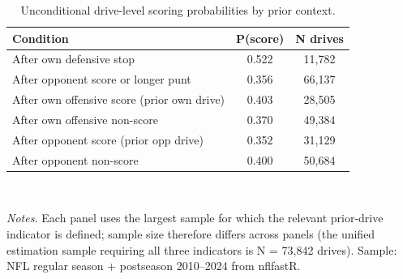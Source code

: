 \begin{table}[htbp]
\centering
\caption{Unconditional drive-level scoring probabilities by prior context.}
\label{tab:descrip}
\begin{tabular}{lcc}
\toprule
Condition & P(score) & N drives \\
\midrule
After own defensive stop & 0.522 & 11,782 \\
After opponent score or longer punt & 0.356 & 66,137 \\
\midrule
After own offensive score (prior own drive) & 0.403 & 28,505 \\
After own offensive non-score & 0.370 & 49,384 \\
\midrule
After opponent score (prior opp drive) & 0.352 & 31,129 \\
After opponent non-score & 0.400 & 50,684 \\
\bottomrule
\end{tabular}
\\[0.5em]
\begin{minipage}{0.95\textwidth}
\footnotesize
\textit{Notes.} Each panel uses the largest sample for which the relevant prior-drive indicator is defined; sample size therefore differs across panels (the unified estimation sample requiring all three indicators is N = 73{,}842 drives). Sample: NFL regular season + postseason 2010--2024 from nflfastR. 
\end{minipage}
\end{table}
